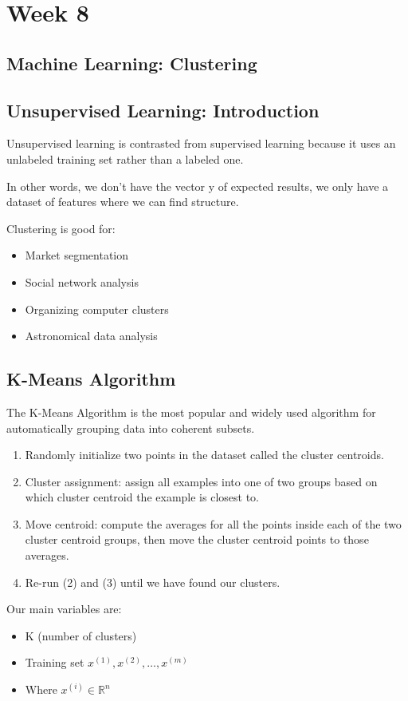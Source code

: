 \chapter{Week 8}
\section{Machine Learning: Clustering}
\section{Unsupervised Learning: Introduction}
Unsupervised learning is contrasted from supervised learning because it uses an unlabeled training set rather than a labeled one.

In other words, we don't have the vector y of expected results, we only have a dataset of features where we can find structure.

Clustering is good for:
\begin{itemize}
	\item Market segmentation
	\item Social network analysis
	\item Organizing computer clusters
	\item Astronomical data analysis
\end{itemize}

\section{K-Means Algorithm}
The K-Means Algorithm is the most popular and widely used algorithm for automatically grouping data into coherent subsets.
\begin{enumerate}
	\item Randomly initialize two points in the dataset called the cluster centroids.
	\item Cluster assignment: assign all examples into one of two groups based on which cluster centroid the example is closest to.
	\item Move centroid: compute the averages for all the points inside each of the two cluster centroid groups, then move the cluster centroid points to those averages.
	\item Re-run (2) and (3) until we have found our clusters.
\end{enumerate}
Our main variables are:
\begin{itemize}
	\item K (number of clusters)
	\item Training set $ x^{(1)}, x^{(2)}, \dots, x^{(m)} $
	\item Where $x^{(i)} \in \mathbb{R}^n$
\end{itemize}

